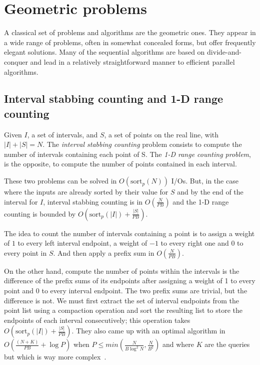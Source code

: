 \section{Geometric problems}

A classical set of problems and algorithms are the geometric ones. They appear in a wide range of problems, often in somewhat concealed forms, but offer frequently elegant solutions. Many of the sequential algorithms are based on divide-and-conquer and lead in a relatively straightforward manner to efficient parallel algorithms.

\subsection{Interval stabbing counting and 1-D range counting}

Given $I$, a set of intervals, and $S$, a set of points on the real line, with $|I| + |S| = N$. The \textit{interval stabbing counting} problem consists to compute the number of intervals containing each point of S. The \textit{1-D range counting problem}, is the opposite, to compute the number of points contained in each interval.

These two problems can be solved in $O(\text{sort}_{p}(N))$ I/Os. But, in the case where the inputs are already sorted by their value for $S$ and by the end of the interval for $I$, interval stabbing counting is in $O(\frac{N}{PB})$ and the 1-D range counting is bounded by $O(\text{sort}_{p}(|I|) + \frac{|S|}{PB})$.

The idea to count the number of intervals containing a point is to assign a weight of $1$ to every left interval endpoint, a weight of $-1$ to every right one and $0$ to every point in $S$. And then apply a prefix sum in $O(\frac{N}{PB})$.

On the other hand, compute the number of points within the intervals is the difference of the prefix sums of its endpoints after assigning a weight of 1 to every point and 0 to every interval endpoint. The two prefix sums are trivial, but the difference is not. We must first extract the set of interval endpoints from the point list using a compaction operation and sort the resulting list to store the endpoints of each interval consecutively; this operation takes $O(\text{sort}_{p}(|I|) + \frac{|S|}{PB})$. They also came up with an optimal algorithm in $O(\frac{(N + K)}{PB} + \log P)$ when $P \leq min(\frac{N}{B \log^{2}N}, \frac{N}{B^{2}})$ and where $K$ are the queries but which is way more complex~\cite{ajwani2011optimal}.

